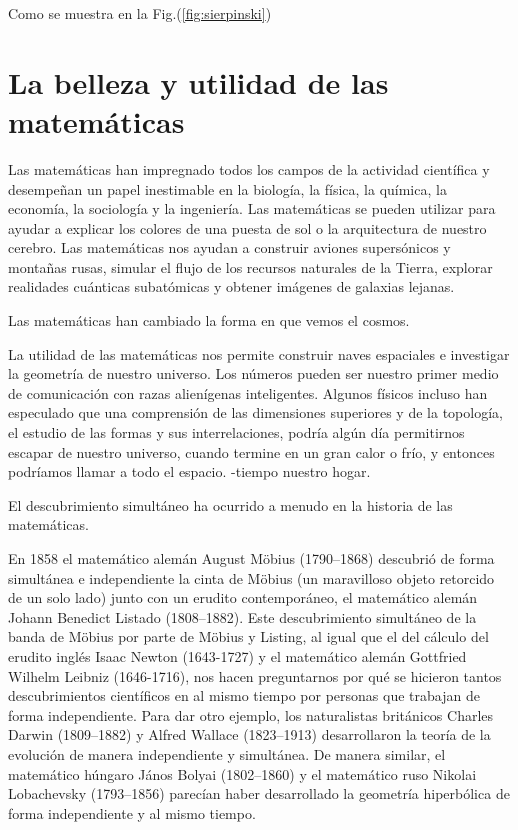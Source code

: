 \documentclass{article}
\begin{document}
Como se muestra en la Fig.(\ref{fig:sierpinski})

\section{La belleza y utilidad de las matem\'aticas}

Las matem\'aticas han impregnado todos los campos de la actividad cient\'ifica y
desempe\~nan un papel inestimable en la biolog\'ia, la f\'isica, la qu\'imica, la
econom\'ia, la sociolog\'ia y la ingenier\'ia. Las matem\'aticas se pueden utilizar para
ayudar a explicar los colores de una puesta de sol o la arquitectura de nuestro
cerebro. Las matem\'aticas nos ayudan a construir aviones supers\'onicos y monta\~nas
rusas, simular el flujo de los recursos naturales de la Tierra, explorar
realidades cu\'anticas subat\'omicas y obtener im\'agenes de galaxias lejanas.

Las matem\'aticas han cambiado la forma en que vemos el cosmos.

La utilidad de las matem\'aticas nos permite construir naves espaciales e
investigar la geometr\'ia de nuestro universo. Los n\'umeros pueden ser nuestro
primer medio de comunicaci\'on con razas alien\'igenas inteligentes. Algunos f\'isicos
incluso han especulado que una comprensi\'on de las dimensiones superiores y de la
topolog\'ia, el estudio de las formas y sus interrelaciones, podr\'ia alg\'un d\'ia
permitirnos escapar de nuestro universo, cuando termine en un gran calor o fr\'io,
y entonces podr\'iamos llamar a todo el espacio. -tiempo nuestro hogar.

El descubrimiento simult\'aneo ha ocurrido a menudo en la historia de las
matem\'aticas.

En 1858 el matem\'atico alem\'an August Möbius (1790–1868) descubri\'o de forma simult\'anea e independiente
la cinta de Möbius (un maravilloso objeto retorcido de un solo lado) junto con
un erudito contempor\'aneo, el matem\'atico alem\'an Johann Benedict Listado
(1808–1882). Este descubrimiento simult\'aneo de la banda de Möbius por parte de
Möbius y Listing, al igual que el del c\'alculo del erudito ingl\'es Isaac Newton
(1643-1727) y el matem\'atico alem\'an Gottfried Wilhelm Leibniz (1646-1716), nos
hacen preguntarnos por qu\'e se hicieron tantos descubrimientos cient\'ificos en al
mismo tiempo por personas que trabajan de forma independiente. Para dar otro
ejemplo, los naturalistas brit\'anicos Charles Darwin (1809–1882) y Alfred Wallace
(1823–1913) desarrollaron la teor\'ia de la evoluci\'on de manera independiente y
simult\'anea. De manera similar, el matem\'atico h\'ungaro J\'anos Bolyai (1802–1860) y
el matem\'atico ruso Nikolai Lobachevsky (1793–1856) parec\'ian haber desarrollado
la geometr\'ia hiperb\'olica de forma independiente y al mismo tiempo. \\
\end{document}
